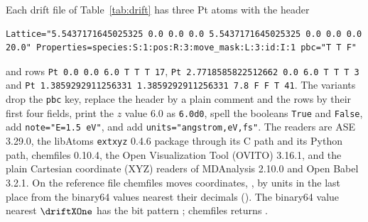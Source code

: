 \documentclass[preprint,12pt]{elsarticle}
\begin{document}
Each drift file of Table~\ref{tab:drift} has three Pt atoms with the header
\begin{lstlisting}
Lattice="5.5437171645025325 0.0 0.0 0.0 5.5437171645025325 0.0 0.0 0.0 20.0" Properties=species:S:1:pos:R:3:move_mask:L:3:id:I:1 pbc="T T F"
\end{lstlisting}
and rows \texttt{Pt 0.0 0.0 6.0 T T T 17}, \texttt{Pt 2.7718585822512662 0.0 6.0 T T T 3} and \texttt{Pt 1.3859292911256331 1.3859292911256331 7.8 F F T 41}.
The variants drop the \texttt{pbc} key, replace the header by a plain comment and the rows by their first four fields, print the \(z\) value 6.0 as \texttt{6.0d0}, spell the booleans \texttt{True} and \texttt{False}, add \texttt{note="E=1.5 eV"}, and add \texttt{units="angstrom,eV,fs"}.
The readers are ASE 3.29.0, the libAtoms \texttt{extxyz} 0.4.6 package \cite{kermodeLibatomsExtxyzV0462026} through its C path and its Python path, chemfiles 0.10.4, the Open Visualization Tool (OVITO) 3.16.1, and the plain Cartesian coordinate (XYZ) readers of MDAnalysis 2.10.0 and Open Babel 3.2.1.
On the reference file chemfiles moves \driftChemMoved{} coordinates, \driftChemCoords{}, by \driftChemUlps{} units in the last place from the binary64 values nearest their decimals ().
The binary64 value nearest \(\driftXOne\) has the bit pattern \texttt{\driftXOneBits}; chemfiles returns \texttt{\driftXOneChemBits}.
\end{document}
